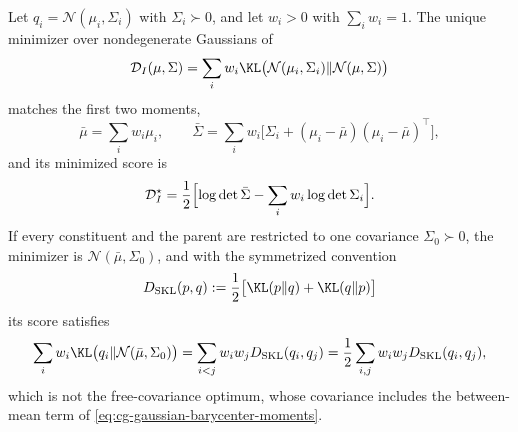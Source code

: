 Let \(q_i=\mathcal N(\mu_i,\Sigma_i)\) with \(\Sigma_i\succ0\), and let
\(w_i>0\) with \(\sum_iw_i=1\). The unique minimizer over nondegenerate
Gaussians of
\begin{equation}
\mathcal D_I(\mu,\Sigma)
=\sum_i w_i\KL\bigl(\mathcal N(\mu_i,\Sigma_i)\Vert\mathcal N(\mu,\Sigma)\bigr)
\label{eq:cg-gaussian-barycenter-objective}
\end{equation}
matches the first two moments,
\begin{equation}
\bar\mu=\sum_i w_i\mu_i,\qquad
\bar\Sigma=\sum_i w_i\bigl[\Sigma_i+(\mu_i-\bar\mu)(\mu_i-\bar\mu)^\top\bigr],
\label{eq:cg-gaussian-barycenter-moments}
\end{equation}
and its minimized score is
\begin{equation}
\mathcal D_I^\star
=\frac12\Bigl[
\log\det\bar\Sigma-\sum_i w_i\log\det\Sigma_i
\Bigr].
\label{eq:cg-gaussian-barycenter-score}
\end{equation}
If every constituent and the parent are restricted to one covariance
\(\Sigma_0\succ0\), the minimizer is \(\mathcal N(\bar\mu,\Sigma_0)\), and with
the symmetrized convention
\begin{equation}
D_{\mathrm{SKL}}(p,q)
:=\frac12\bigl[\KL(p\Vert q)+\KL(q\Vert p)\bigr]
\label{eq:cg-symmetric-kl-convention}
\end{equation}
its score satisfies
\begin{equation}
\sum_i w_i\KL\bigl(q_i\Vert\mathcal N(\bar\mu,\Sigma_0)\bigr)
=\sum_{i<j}w_iw_jD_{\mathrm{SKL}}(q_i,q_j)
=\frac12\sum_{i,j}w_iw_jD_{\mathrm{SKL}}(q_i,q_j),
\label{eq:cg-fixed-covariance-pairwise-identity}
\end{equation}
which is not the free-covariance optimum, whose covariance includes the
between-mean term of \eqref{eq:cg-gaussian-barycenter-moments}.


